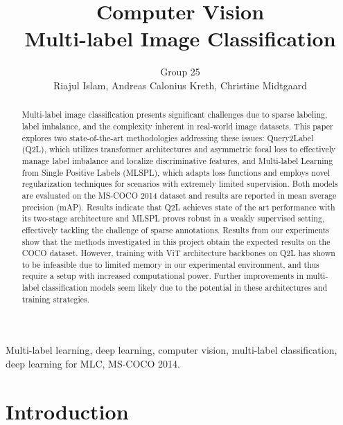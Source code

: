 \documentclass[lettersize,journal]{IEEEtran}
\begin{document}
\title{Computer Vision\\ \vspace{.5em} 
\Large Multi-label Image Classification}
\author{Group 25 \\ \vspace{.2em} Riajul Islam, Andreas Calonius Kreth, Christine Midtgaard}

\maketitle

\begin{abstract}
Multi-label image classification presents significant challenges due to sparse labeling, label imbalance, and the complexity inherent in real-world image datasets. This paper explores two state-of-the-art methodologies addressing these issues: Query2Label (Q2L), which utilizes transformer architectures and asymmetric focal loss to effectively manage label imbalance and localize discriminative features, and Multi-label Learning from Single Positive Labels (MLSPL), which adapts loss functions and employs novel regularization techniques for scenarios with extremely limited supervision. Both models are evaluated on the MS-COCO 2014 dataset and results are reported in mean average precision (mAP). Results indicate that Q2L achieves state of the art performance with its two-stage architecture and MLSPL proves robust in a weakly supervised setting, effectively tackling the challenge of sparse annotations. Results from our experiments show that the methods investigated in this project obtain the expected results on the COCO dataset. However, training with ViT architecture backbones on Q2L has shown to be infeasible due to limited memory in our experimental environment, and thus require a setup with increased computational power. Further improvements in multi-label classification models seem likely due to the potential in these architectures and training strategies.
\end{abstract}

\begin{IEEEkeywords}
Multi-label learning, deep learning, computer vision, multi-label
classification, deep learning for MLC, MS-COCO 2014. 

\end{IEEEkeywords}


\section{Introduction}
\end{document}
